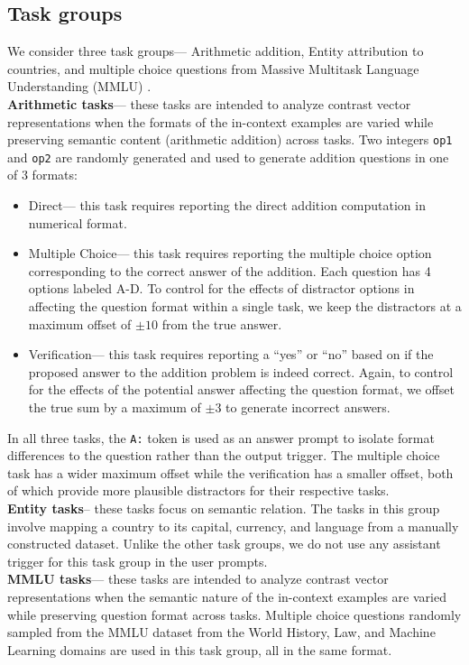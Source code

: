 \documentclass[11pt]{article}
\begin{document}
\subsection{Task groups}
\label{subsec:taskgrps}
We consider three task groups--- Arithmetic addition, Entity attribution to countries, and multiple choice questions from Massive Multitask Language Understanding (MMLU) \citep{Hendrycks2020-ae}. \\[1em]
\textbf{Arithmetic tasks}--- these tasks are intended to analyze contrast vector representations when the formats of the in-context examples are varied while preserving semantic content (arithmetic addition) across tasks. Two integers \texttt{op1} and \texttt{op2} are randomly generated and used to generate addition questions in one of 3 formats:
\begin{itemize}
    \item Direct--- this task requires reporting the direct addition computation in numerical format.
    \item Multiple Choice--- this task requires reporting the multiple choice option corresponding to the correct answer of the addition. Each question has 4 options labeled A-D. To control for the effects of distractor options in affecting the question format within a single task, we keep the distractors at a maximum offset of \(\pm 10\) from the true answer.
    \item Verification--- this task requires reporting a ``yes'' or ``no'' based on if the proposed answer to the addition problem is indeed correct. Again, to control for the effects of the potential answer affecting the question format, we offset the true sum by a maximum of \(\pm 3\) to generate incorrect answers.
\end{itemize}
In all three tasks, the \texttt{A:} token is used as an answer prompt to isolate format differences to the question rather than the output trigger. The multiple choice task has a wider maximum offset while the verification has a smaller offset, both of which provide more plausible distractors for their respective tasks. \\[1em]
\textbf{Entity tasks}-- these tasks focus on semantic relation. The tasks in this group involve mapping a country to its capital, currency, and language from a manually constructed dataset. Unlike the other task groups, we do not use any assistant trigger for this task group in the user prompts.\\[1em] 
\textbf{MMLU tasks}--- these tasks are intended to analyze contrast vector representations when the semantic nature of the in-context examples are varied while preserving question format across tasks. Multiple choice questions randomly sampled from the MMLU dataset from the World History, Law, and Machine Learning domains are used in this task group, all in the same format. \\[1em]
\end{document}

